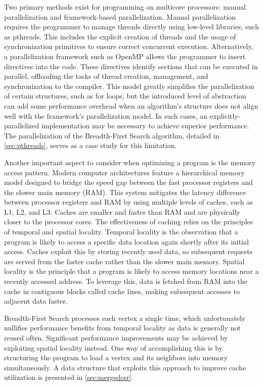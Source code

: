 Two primary methods exist for programming on multicore processors: manual parallelization and framework-based parallelization. Manual parallelization requires the programmer to manage threads directly using low-level libraries, such as pthreads. This includes the explicit creation of threads and the usage of synchronization primitives to ensure correct concurrent execution. Alternatively, a parallelization framework such as OpenMP \cite{dagum1998openmp} allows the programmer to insert directives into the code. These directives identify sections that can be executed in parallel, offloading the tasks of thread creation, management, and synchronization to the compiler. This model greatly simplifies the parallelization of certain structures, such as for loops, but the introduced level of abstraction can add some performance overhead when an algorithm’s structure does not align well with the framework’s parallelization model. In such cases, an explicitly-parallelized implementation may be necessary to achieve superior performance. The parallelization of the Breadth-First Search algorithm, detailed in \cref{sec:pthreads}, serves as a case study for this limitation.

Another important aspect to consider when optimizing a program is the memory access pattern. Modern computer architectures feature a hierarchical memory model designed to bridge the speed gap between the fast processor registers and the slower main memory (RAM). This system mitigates the latency difference between processor registers and RAM by using multiple levels of caches, such as L1, L2, and L3. Caches are smaller and faster than RAM and are physically closer to the processor cores. The effectiveness of caching relies on the principles of temporal and spatial locality. Temporal locality is the observation that a program is likely to access a specific data location again shortly after its initial access. Caches exploit this by storing recently used data, so subsequent requests are served from the faster cache rather than the slower main memory. Spatial locality is the principle that a program is likely to access memory locations near a recently accessed address. To leverage this, data is fetched from RAM into the cache in contiguous blocks called cache lines, making subsequent accesses to adjacent data faster.

Breadth-First Search processes each vertex a single time, which unfortunately nullifies performance benefits from temporal locality as data is generally not reused often. Significant performance improvements may be achieved by exploiting spatial locality instead. One way of accomplishing this is by structuring the program to load a vertex and its neighbors into memory simultaneously. A data structure that exploits this approach to improve cache utilization is presented in \cref{sec:mergedcsr}.


